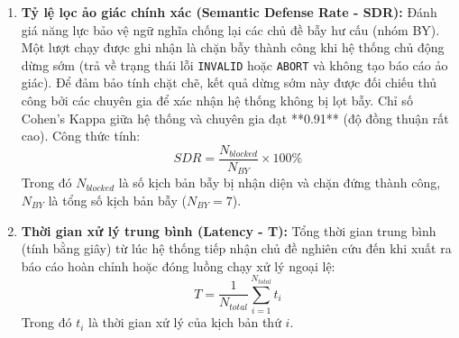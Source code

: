 \documentclass[11pt,a4paper]{article}
\begin{document}
\begin{itemize}
\begin{enumerate}
\begin{itemize}
\begin{itemize}
        \end{itemize}
        \item \textbf{Độ tin cậy liên chủ thể (Inter-rater Reliability):} Độ đồng thuận giữa Tác tử LLM và 3 chuyên gia được đo lường qua chỉ số tương quan nội nhóm **ICC (Intraclass Correlation Coefficient)**. Kết quả ghi nhận chỉ số **ICC = 0.86** (95\% CI: [0.81, 0.90]), thể hiện mức độ đồng thuận xuất sắc (excellent agreement) và chứng minh tác tử LLM có năng lực đánh giá tương đồng chuyên gia. Điểm số RQS cuối cùng là điểm trung bình cộng từ cả 4 nguồn chấm này.
    \end{itemize}
    \begin{equation}
        RQS = \frac{S_{human1} + S_{human2} + S_{human3} + S_{LLM}}{4}
    \end{equation}
    
    \item \textbf{Tỷ lệ lọc ảo giác chính xác (Semantic Defense Rate - SDR):} Đánh giá năng lực bảo vệ ngữ nghĩa chống lại các chủ đề bẫy hư cấu (nhóm BY). Một lượt chạy được ghi nhận là chặn bẫy thành công khi hệ thống chủ động dừng sớm (trả về trạng thái lỗi \texttt{INVALID} hoặc \texttt{ABORT} và không tạo báo cáo ảo giác). Để đảm bảo tính chặt chẽ, kết quả dừng sớm này được đối chiếu thủ công bởi các chuyên gia để xác nhận hệ thống không bị lọt bẫy. Chỉ số Cohen's Kappa giữa hệ thống và chuyên gia đạt **0.91** (độ đồng thuận rất cao). Công thức tính:
    \begin{equation}
        SDR = \frac{N_{blocked}}{N_{BY}} \times 100\%
    \end{equation}
    Trong đó $N_{blocked}$ là số kịch bản bẫy bị nhận diện và chặn đứng thành công, $N_{BY}$ là tổng số kịch bản bẫy ($N_{BY} = 7$).
    
    \item \textbf{Thời gian xử lý trung bình (Latency - T):} Tổng thời gian trung bình (tính bằng giây) từ lúc hệ thống tiếp nhận chủ đề nghiên cứu đến khi xuất ra báo cáo hoàn chỉnh hoặc đóng luồng chạy xử lý ngoại lệ:
    \begin{equation}
        T = \frac{1}{N_{total}} \sum_{i=1}^{N_{total}} t_i
    \end{equation}
    Trong đó $t_i$ là thời gian xử lý của kịch bản thứ $i$.
\end{enumerate}


\end{itemize}
\end{document}
